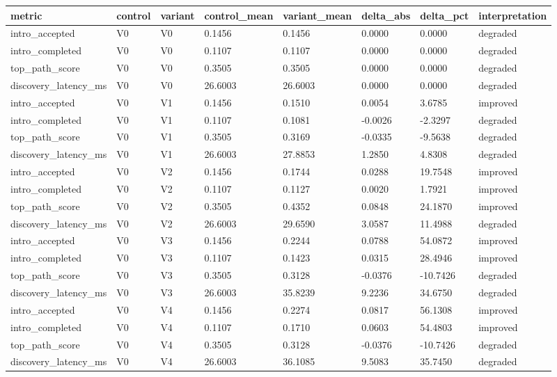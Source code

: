 \begin{tabular}{llllllll}
\toprule
metric & control & variant & control_mean & variant_mean & delta_abs & delta_pct & interpretation \\
\midrule
intro_accepted & V0 & V0 & 0.1456 & 0.1456 & 0.0000 & 0.0000 & degraded \\
intro_completed & V0 & V0 & 0.1107 & 0.1107 & 0.0000 & 0.0000 & degraded \\
top_path_score & V0 & V0 & 0.3505 & 0.3505 & 0.0000 & 0.0000 & degraded \\
discovery_latency_ms & V0 & V0 & 26.6003 & 26.6003 & 0.0000 & 0.0000 & degraded \\
intro_accepted & V0 & V1 & 0.1456 & 0.1510 & 0.0054 & 3.6785 & improved \\
intro_completed & V0 & V1 & 0.1107 & 0.1081 & -0.0026 & -2.3297 & degraded \\
top_path_score & V0 & V1 & 0.3505 & 0.3169 & -0.0335 & -9.5638 & degraded \\
discovery_latency_ms & V0 & V1 & 26.6003 & 27.8853 & 1.2850 & 4.8308 & degraded \\
intro_accepted & V0 & V2 & 0.1456 & 0.1744 & 0.0288 & 19.7548 & improved \\
intro_completed & V0 & V2 & 0.1107 & 0.1127 & 0.0020 & 1.7921 & improved \\
top_path_score & V0 & V2 & 0.3505 & 0.4352 & 0.0848 & 24.1870 & improved \\
discovery_latency_ms & V0 & V2 & 26.6003 & 29.6590 & 3.0587 & 11.4988 & degraded \\
intro_accepted & V0 & V3 & 0.1456 & 0.2244 & 0.0788 & 54.0872 & improved \\
intro_completed & V0 & V3 & 0.1107 & 0.1423 & 0.0315 & 28.4946 & improved \\
top_path_score & V0 & V3 & 0.3505 & 0.3128 & -0.0376 & -10.7426 & degraded \\
discovery_latency_ms & V0 & V3 & 26.6003 & 35.8239 & 9.2236 & 34.6750 & degraded \\
intro_accepted & V0 & V4 & 0.1456 & 0.2274 & 0.0817 & 56.1308 & improved \\
intro_completed & V0 & V4 & 0.1107 & 0.1710 & 0.0603 & 54.4803 & improved \\
top_path_score & V0 & V4 & 0.3505 & 0.3128 & -0.0376 & -10.7426 & degraded \\
discovery_latency_ms & V0 & V4 & 26.6003 & 36.1085 & 9.5083 & 35.7450 & degraded \\
\bottomrule
\end{tabular}
